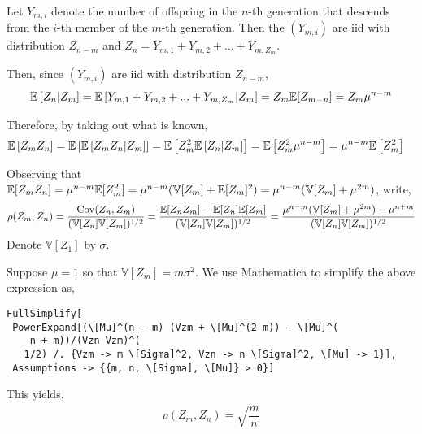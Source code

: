 \documentclass[10pt]{article}
\begin{document}
\begin{solution}[Solution]
Let \( Y_{m,i} \) denote the number of offspring in the \( n \)-th generation that descends from the \( i \)-th member of the \( m \)-th generation. Then the \( (Y_{m,i}) \) are iid with distribution \( Z_{n-m} \) and \( Z_n = Y_{m,1}+Y_{m,2}+...+Y_{m,Z_m} \). 

Then, since \( (Y_{m,i}) \) are iid with distribution \( Z_{n-m} \),
\begin{align*}
    \mathbb{E} \left[ Z_n | Z_m \right] = \mathbb{E} \left[ Y_{m,1}+Y_{m,2}+...+Y_{m,Z_m} | Z_m \right] = Z_m \mathbb{E}[Z_{m-n}] = Z_m \mu^{n-m}
\end{align*}

Therefore, by taking out what is known,
\begin{align*}
    \mathbb{E} \left[ Z_mZ_n \right] &= \mathbb{E} \left[ \mathbb{E} \left[ Z_mZ_n | Z_m \right] \right] = \mathbb{E} \left[ Z_m^2 \mathbb{E}  \left[ Z_n | Z_m \right] \right] 
    = \mathbb{E} \left[ Z_m^2 \mu^{n-m} \right] = \mu^{n-m}\mathbb{E} \left[ Z_m^2 \right]
\end{align*}

Observing that \( \mathbb{E}[Z_mZ_n] = \mu^{n-m}\mathbb{E}[Z_m^2] = \mu^{n-m}(\mathbb{V}[Z_m] + \mathbb{E}[Z_m]^2) = \mu^{n-m}(\mathbb{V}[Z_m]+\mu^{2m}) \), write,
\begin{align*}
    \rho(Z_m,Z_n) &= \dfrac{\operatorname{Cov}(Z_n,Z_m)}{(\mathbb{V}[Z_n] \mathbb{V}[Z_m])^{1/2}} 
    = \dfrac{\mathbb{E}[Z_nZ_m]-\mathbb{E}[Z_n]\mathbb{E}[Z_m]}{(\mathbb{V}[Z_n]\mathbb{V}[Z_m])^{1/2}} 
    = \dfrac{\mu^{n-m}(\mathbb{V}[Z_m]+\mu^{2m})-\mu^{n+m}}{(\mathbb{V}[Z_n]\mathbb{V}[Z_m])^{1/2}} \\
\end{align*}
Denote \( \mathbb{V}[Z_1] \) by \( \sigma \).


Suppose \( \mu=1 \) so that \( \mathbb{V}[Z_m]=m\sigma^2 \). We use Mathematica to simplify the above expression as,
\begin{lstlisting}
FullSimplify[
 PowerExpand[(\[Mu]^(n - m) (Vzm + \[Mu]^(2 m)) - \[Mu]^(
    n + m))/(Vzn Vzm)^(
   1/2) /. {Vzm -> m \[Sigma]^2, Vzn -> n \[Sigma]^2, \[Mu] -> 1}], 
 Assumptions -> {{m, n, \[Sigma], \[Mu]} > 0}]    
\end{lstlisting}

This yields,
\begin{align*}
    \rho(Z_m,Z_n) = \sqrt{\dfrac{m}{n}}
\end{align*}
\iffalse
\begin{align*}
    \rho(Z_m,Z_n) &= \dfrac{\operatorname{Cov}(Z_n,Z_m)}{(\mathbb{V}[Z_n] \mathbb{V}[Z_m])^{1/2}} \\
    &= \dfrac{\EE[Z_nZ_m]-\EE[Z_n]\EE[Z_m]}{(n\sigma^2m\sigma^2)^{1/2}} \\
    &= \dfrac{\mu^{n-m}\EE[Z_m^2]-\mu^n\mu^m}{\sigma^2(nm)^{1/2}} \\
    &= \dfrac{\mu^{n-m}(m\sigma^2+\mu^{2m})-\mu^n\mu^m}{\sigma^2(nm)^{1/2}} \\
    &= \sqrt{\dfrac{m}{n}}\mu^{n-m}
\end{align*}
\fi


\end{solution}
\end{document}
